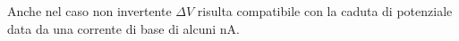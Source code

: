 Anche nel caso non invertente $\Delta V$ risulta compatibile con la caduta di potenziale data da una corrente di base di alcuni \si{\nano\ampere}.
















































































